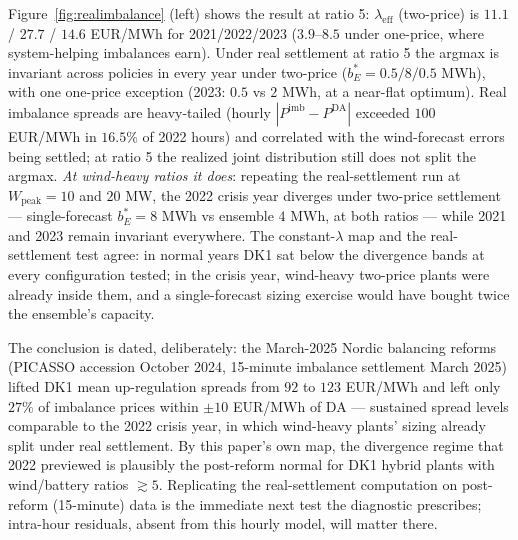 \documentclass[11pt]{article}
\begin{document}
Figure~\ref{fig:realimbalance} (left) shows the result at ratio 5: $\lambda_{\mathrm{eff}}$ (two-price) is $11.1$ / $27.7$ / $14.6$ EUR/MWh for 2021/2022/2023 ($3.9$--$8.5$ under one-price, where system-helping imbalances earn). Under real settlement at ratio 5 the argmax is invariant across policies in every year under two-price ($b_E^* = 0.5/8/0.5$ MWh), with one one-price exception (2023: $0.5$ vs $2$ MWh, at a near-flat optimum). Real imbalance spreads are heavy-tailed (hourly $|P^{\mathrm{imb}} - P^{\mathrm{DA}}|$ exceeded $100$ EUR/MWh in $16.5\%$ of 2022 hours) and correlated with the wind-forecast errors being settled; at ratio 5 the realized joint distribution still does not split the argmax. \emph{At wind-heavy ratios it does}: repeating the real-settlement run at $W_{\mathrm{peak}} = 10$ and $20$ MW, the 2022 crisis year diverges under two-price settlement --- single-forecast $b_E^* = 8$ MWh vs ensemble $4$ MWh, at both ratios --- while 2021 and 2023 remain invariant everywhere. The constant-$\lambda$ map and the real-settlement test agree: in normal years DK1 sat below the divergence bands at every configuration tested; in the crisis year, wind-heavy two-price plants were already inside them, and a single-forecast sizing exercise would have bought twice the ensemble's capacity.

The conclusion is dated, deliberately: the March-2025 Nordic balancing reforms (PICASSO accession October 2024, 15-minute imbalance settlement March 2025) lifted DK1 mean up-regulation spreads from $92$ to $123$ EUR/MWh and left only $27\%$ of imbalance prices within $\pm 10$ EUR/MWh of DA \citep{bluepower2025} --- sustained spread levels comparable to the 2022 crisis year, in which wind-heavy plants' sizing already split under real settlement. By this paper's own map, the divergence regime that 2022 previewed is plausibly the post-reform normal for DK1 hybrid plants with wind/battery ratios $\gtrsim 5$. Replicating the real-settlement computation on post-reform (15-minute) data is the immediate next test the diagnostic prescribes; intra-hour residuals, absent from this hourly model, will matter there.
\end{document}
